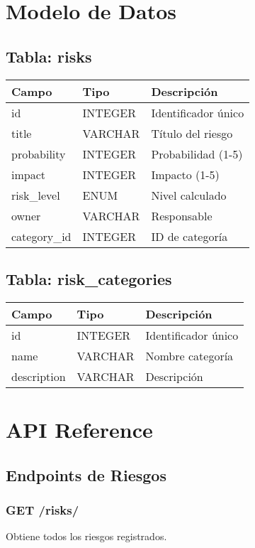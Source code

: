\documentclass[12pt, a4paper, oneside]{article}
\begin{document}
\section{Modelo de Datos}

\subsection{Tabla: risks}
\begin{tabular}{|l|l|l|}
\hline
Campo & Tipo & Descripción \\
\hline
id & INTEGER & Identificador único \\
title & VARCHAR & Título del riesgo \\
probability & INTEGER & Probabilidad (1-5) \\
impact & INTEGER & Impacto (1-5) \\
risk\_level & ENUM & Nivel calculado \\
owner & VARCHAR & Responsable \\
category\_id & INTEGER & ID de categoría \\
\hline
\end{tabular}

\subsection{Tabla: risk\_categories}
\begin{tabular}{|l|l|l|}
\hline
Campo & Tipo & Descripción \\
\hline
id & INTEGER & Identificador único \\
name & VARCHAR & Nombre categoría \\
description & VARCHAR & Descripción \\
\hline
\end{tabular}

\section{API Reference}

\subsection{Endpoints de Riesgos}

\subsubsection{GET /risks/}
Obtiene todos los riesgos registrados.
\end{document}
